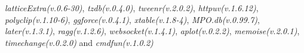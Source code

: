 \documentclass[
]{book}
\begin{document}
\emph{latticeExtra(v.0.6-30)}, \emph{tzdb(v.0.4.0)}, \emph{tweenr(v.2.0.2)}, \emph{httpuv(v.1.6.12)}, \emph{polyclip(v.1.10-6)}, \emph{ggforce(v.0.4.1)}, \emph{xtable(v.1.8-4)}, \emph{MPO.db(v.0.99.7)}, \emph{later(v.1.3.1)}, \emph{ragg(v.1.2.6)}, \emph{websocket(v.1.4.1)}, \emph{aplot(v.0.2.2)}, \emph{memoise(v.2.0.1)}, \emph{timechange(v.0.2.0)} and \emph{cmdfun(v.1.0.2)}

  
\end{document}
